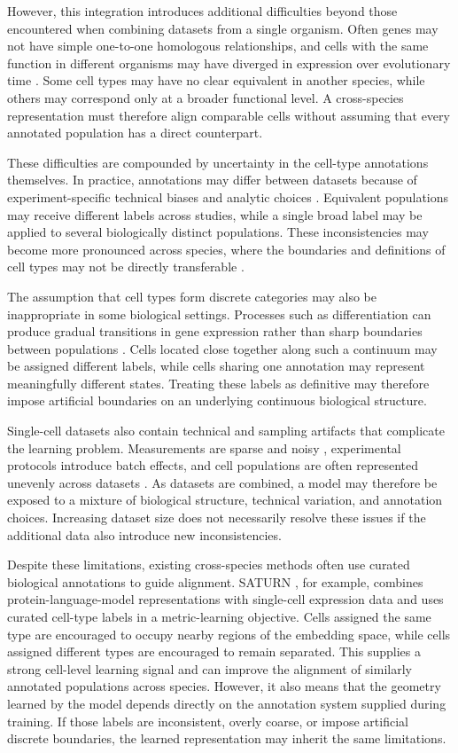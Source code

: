 \documentclass{article}
\begin{document}
However, this integration introduces additional difficulties beyond those encountered when combining datasets from a single organism. Often genes may not have simple one-to-one homologous relationships, and cells with the same function in different organisms may have diverged in expression over evolutionary time \cite{SATURN-xfer}. Some cell types may have no clear equivalent in another species, while others may correspond only at a broader functional level. A cross-species representation must therefore align comparable cells without assuming that every annotated population has a direct counterpart.

These difficulties are compounded by uncertainty in the cell-type annotations themselves. In practice, annotations may differ between datasets because of experiment-specific technical biases and analytic choices \cite{MetaNeighbour}. Equivalent populations may receive different labels across studies, while a single broad label may be applied to several biologically distinct populations. These inconsistencies may become more pronounced across species, where the boundaries and definitions of cell types may not be directly transferable \cite{SAMap}.

The assumption that cell types form discrete categories may also be inappropriate in some biological settings. Processes such as differentiation can produce gradual transitions in gene expression rather than sharp boundaries between populations \cite{ContinuousBiology}. Cells located close together along such a continuum may be assigned different labels, while cells sharing one annotation may represent meaningfully different states. Treating these labels as definitive may therefore impose artificial boundaries on an underlying continuous biological structure.

Single-cell datasets also contain technical and sampling artifacts that complicate the learning problem. Measurements are sparse and noisy \cite{ExperimentNoise}, experimental protocols introduce batch effects, and cell populations are often represented unevenly across datasets \cite{BatchEffects}. As datasets are combined, a model may therefore be exposed to a mixture of biological structure, technical variation, and annotation choices. Increasing dataset size does not necessarily resolve these issues if the additional data also introduce new inconsistencies.

Despite these limitations, existing cross-species methods often use curated biological annotations to guide alignment. SATURN \cite{SATURN}, for example, combines protein-language-model representations with single-cell expression data and uses curated cell-type labels in a metric-learning objective. Cells assigned the same type are encouraged to occupy nearby regions of the embedding space, while cells assigned different types are encouraged to remain separated. This supplies a strong cell-level learning signal and can improve the alignment of similarly annotated populations across species. However, it also means that the geometry learned by the model depends directly on the annotation system supplied during training. If those labels are inconsistent, overly coarse, or impose artificial discrete boundaries, the learned representation may inherit the same limitations.
\end{document}
